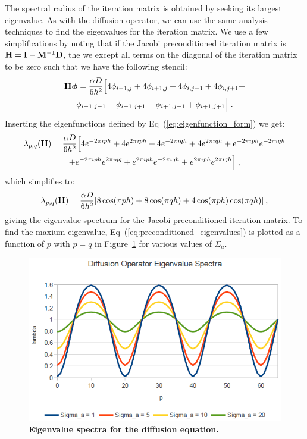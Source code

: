 The spectral radius of the iteration matrix is obtained by seeking its
largest eigenvalue. As with the diffusion operator, we can use the
same analysis techniques to find the eigenvalues for the iteration
matrix. We use a few simplifications by noting that if the Jacobi
preconditioned iteration matrix is $\mathbf{H} = \mathbf{I} -
\mathbf{M}^{-1}\mathbf{D}$, the we except all terms on the diagonal of the
iteration matrix to be zero such that we have the following stencil:
\begin{multline}
  \mathbf{H}\boldsymbol{\phi} = \frac{\alpha D}{6h^2}\Big[4 \phi_{i-1,j} +
    4 \phi_{i+1,j} + 4 \phi_{i,j-1} + 4 \phi_{i,j+1}
    +\\ \phi_{i-1,j-1} + \phi_{i-1,j+1} + \phi_{i+1,j-1} +
    \phi_{i+1,j+1}\Big]\:.
  \label{eq:iteration_stencil}
\end{multline}
Inserting the eigenfunctions defined by
Eq~(\ref{eq:eigenfunction_form}) we get:
\begin{multline}
  \lambda_{p,q}(\mathbf{H}) = \frac{\alpha D}{6h^2}\Big[4 e^{-2 \pi \imath p
      h} + 4 e^{2 \pi \imath p h} + 4 e^{-2 \pi \imath q h} + 4 e^{2
      \pi \imath q h} + e^{-2 \pi \imath p h} e^{-2 \pi \imath q h}
    \\ + e^{-2 \pi \imath p h} e^{2 \pi \imath q q} + e^{2 \pi \imath
      p h} e^{-2 \pi \imath q h} + e^{2 \pi \imath p h} e^{2 \pi
      \imath q h}\Big]\:,
  \label{eq:iteration_deriv}
\end{multline}
which simplifies to:
\begin{equation}
  \lambda_{p,q}(\mathbf{H}) = \frac{\alpha D}{6h^2}[ 8 \cos(\pi p h) + 8
    \cos(\pi q h) + 4 \cos(\pi p h) \cos(\pi q h)]\:,
  \label{eq:iteration_spectrum}
\end{equation}
giving the eigenvalue spectrum for the Jacobi preconditioned iteration
matrix. To find the maxium eigenvalue,
Eq~(\ref{eq:preconditioned_eigenvalues}) is plotted as a function of
$p$ with $p=q$ in Figure~\ref{fig:diffusion_spectrum} for various
values of $\Sigma_a$.
\begin{figure}[t!]
  \begin{center}
    \includegraphics[width=5in,clip]{chapters/parallel_mc/diffusion_spectrum.png}
  \end{center}
  \caption{\textbf{Eigenvalue spectra for the diffusion equation.}}
  \label{fig:diffusion_spectrum}
\end{figure}
